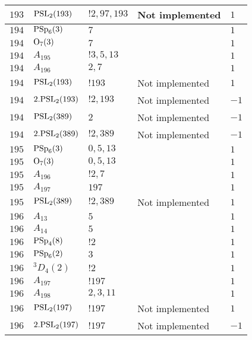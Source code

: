 \documentclass[a4paper, 11pt]{article}
\begin{document}
\begin{longtable}{lllll}
        $ 193 $ & $ {\rm PSL}_{2}(193) $ & $ !2, 97, 193 $ &  Not implemented & $ 1$ \\ \hline
        $ 194 $ & $ {\rm PSp}_{6}(3) $ & $ 7 $ & $ ~ $ & $ 1$ \\ \hline
        $ 194 $ & $ {\rm O}_{7}(3) $ & $ 7 $ & $ ~ $ & $ 1$ \\ \hline
        $ 194 $ & $ A_{195} $ & $ !3, 5, 13 $ & $ ~ $ & $ 1$ \\ \hline
        $ 194 $ & $ A_{196} $ & $ 2, 7 $ & $ ~ $ & $ 1$ \\ \hline
        $ 194 $ & $ {\rm PSL}_{2}(193) $ & $ !193 $ &  Not implemented & $ 1$ \\ \hline
        $ 194 $ & $ 2.{\rm PSL}_{2}(193) $ & $ !2, 193 $ &  Not implemented & $ -1$ \\ \hline
        $ 194 $ & $ {\rm PSL}_{2}(389) $ & $ 2 $ &  Not implemented & $ -1$ \\ \hline
        $ 194 $ & $ 2.{\rm PSL}_{2}(389) $ & $ !2, 389 $ &  Not implemented & $ -1$ \\ \hline
        $ 195 $ & $ {\rm PSp}_{6}(3) $ & $ 0,5,13 $ & $ ~ $ & $ 1$ \\ \hline
        $ 195 $ & $ {\rm O}_{7}(3) $ & $ 0, 5, 13 $ & $ ~ $ & $ 1$ \\ \hline
        $ 195 $ & $ A_{196} $ & $ !2, 7 $ & $ ~ $ & $ 1$ \\ \hline
        $ 195 $ & $ A_{197} $ & $ 197 $ & $ ~ $ & $ 1$ \\ \hline
        $ 195 $ & $ {\rm PSL}_{2}(389) $ & $ !2, 389 $ &  Not implemented & $ 1$ \\ \hline
        $ 196 $ & $ A_{13} $ & $ 5 $ & $ ~ $ & $ 1$ \\ \hline
        $ 196 $ & $ A_{14} $ & $ 5 $ & $ ~ $ & $ 1$ \\ \hline
        $ 196 $ & $ {\rm PSp}_{4}(8) $ & $ ! 2 $ & $ ~ $ & $ 1$ \\ \hline
        $ 196 $ & $ {\rm PSp}_{6}(2) $ & $ 3 $ & $ ~ $ & $ 1$ \\ \hline
        $ 196 $ & $ {}^{3}D_{4}(2) $ & $ ! 2 $ & $ ~ $ & $ 1$ \\ \hline
        $ 196 $ & $ A_{197} $ & $ !197 $ & $ ~ $ & $ 1$ \\ \hline
        $ 196 $ & $ A_{198} $ & $ 2, 3, 11 $ & $ ~ $ & $ 1$ \\ \hline
        $ 196 $ & $ {\rm PSL}_{2}(197) $ & $ !197 $ &  Not implemented & $ 1$ \\ \hline
        $ 196 $ & $ 2.{\rm PSL}_{2}(197) $ & $ !197 $ &  Not implemented & $ -1$ \\ \hline

\end{longtable}
\end{document}
